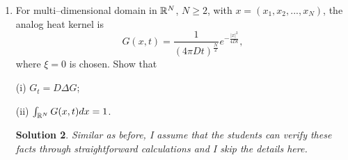 \documentclass[6pt]{article}
\newtheorem{solution}{Solution}
\numberwithin{equation}{section}
\def\mathbb{\Bbb}
\begin{document}
\begin{enumerate}
\begin{solution}
\begin{figure}[h!]
    \centering
    \begin{subfigure}[b]{0.475\textwidth}
        \texttt{[image: hw5figure3.eps]}
        \caption*{Formation of $\delta$ as $t\rightarrow 0^+$}
    \end{subfigure}\hspace{5mm}
    \begin{subfigure}[b]{0.475\textwidth}
        \texttt{[image: hw5figure4.eps]}
        \caption*{Smoothing effect of diffusion rate}
    \end{subfigure}
    \caption{Formation of $\delta$ and effect of diffusion rate for Problem 2.}\label{HK2}
\end{figure}

There are some additional plots I added in Figure \ref{HK1} and Figure \ref{HK2} to examine some interesting and also important phenomena such as the convergence of the heat kernel to a $\delta$-function as $t\rightarrow 0^+$, the smoothing effect of diffusion rate $D$, etc.  We will provide a rigourous proof later in this class.
\end{solution}


\item For multi--dimensional domain in $\mathbb R^N$, $N\geq2$, with $x=(x_1,x_2,...,x_N)$, the analog heat kernel is
\[G(x,t)=\frac{1}{{(4\pi Dt)}^\frac{N}{2}}e^{-\frac{|x|^2}{4Dt}},\]
where $\xi=0$ is chosen.  Show that

(i) $G_t=D\Delta G$;

(ii) $\int_{\mathbb R^N}G(x,t)dx=1$.
\begin{solution}
Similar as before, I assume that the students can verify these facts through straightforward calculations and I skip the details here.
\end{solution}


\end{enumerate}
\end{document}
